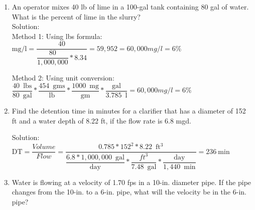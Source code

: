 \documentclass{article}
\begin{document}
 


\begin{enumerate}

\item An operator mixes 40 lb of lime in a 100-gal tank containing 80 gal of water. What is the percent of lime in the slurry?\\
\vspace{0.3cm}
Solution:\\
\vspace{0.3cm}
Method 1: Using lbs formula: $\mathrm{mg/l}=\dfrac{40}{\dfrac{80}{1,000,000}*8.34}=59,952=60,000mg/l=\boxed{6\%}$

\vspace{0.3cm}

Method 2: Using unit conversion: $\dfrac{40 \enspace  \mathrm{lbs}}{80 \enspace\mathrm{gal}}*\dfrac{454 \enspace  \mathrm{gms}}{\mathrm{lb}}*\dfrac{1000 \enspace  \mathrm{mg}}{\mathrm{gm}}*\dfrac{\mathrm{gal}}{3.785 \enspace  \mathrm{l}}=60,000mg/l=\boxed{6\%}$

\item Find the detention time in minutes for a clarifier that has a diameter of 152 ft and a water depth of 8.22 ft, if the flow rate is 6.8 mgd.
\vspace{0.4cm}

Solution: 
$
\mathrm{DT}=\dfrac{Volume}{Flow}=\dfrac{0.785*152^2*8.22\enspace  \mathrm{ft^3}}{\dfrac{6.8*1,000,000 \enspace  \mathrm{gal}}{\mathrm{day}}*\dfrac{ft^3}{7.48 \enspace  \mathrm{gal}}*\dfrac{\mathrm{day}}{1,440 \enspace  \mathrm{min}}}=\boxed{236 \mathrm{~min}}
$

\vspace{0.3cm}

\item Water is flowing at a velocity of 1.70 fps in a 10-in. diameter pipe. If the pipe changes from the 10-in. to a 6-in. pipe, what will the velocity be in the 6-in. pipe?


\end{enumerate}
\end{document}
